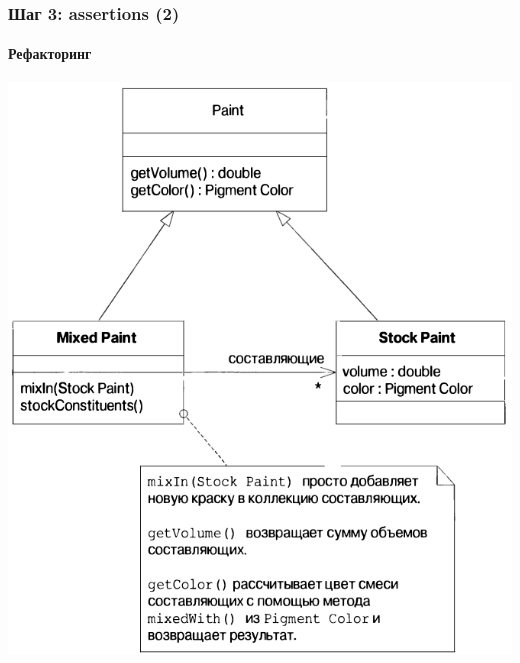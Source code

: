 \documentclass{../../slides-style}
\begin{document}
	\begin{frame}
		\frametitle{Шаг 3: assertions (2)}
		\framesubtitle{Рефакторинг}
		\begin{center}
			\includegraphics[height=0.8\textheight]{stockPaints.png}
		\end{center}
	\end{frame}
\end{document}

